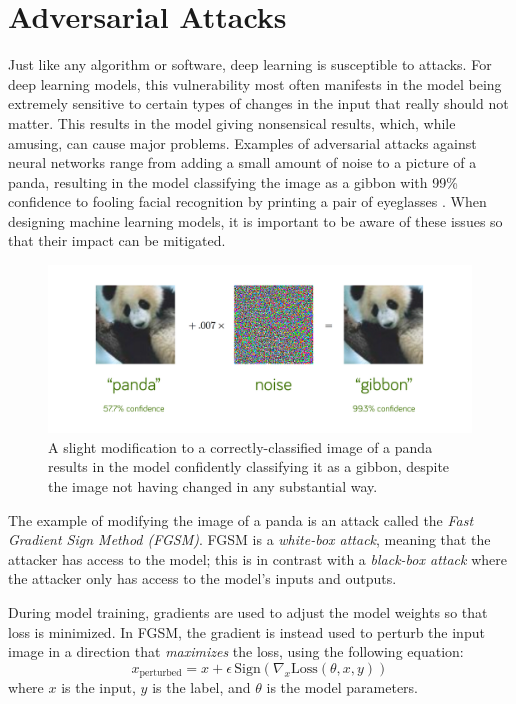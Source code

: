 \section*{Adversarial Attacks}
 
Just like any algorithm or software, deep learning is susceptible to attacks.
For deep learning models, this vulnerability most often manifests in the model being extremely sensitive to certain types of changes in the input that really should not matter.
This results in the model giving nonsensical results, which, while amusing, can cause major problems.
Examples of adversarial attacks against neural networks range from adding a small amount of noise to a picture of a panda, resulting in the model classifying the image as a gibbon with 99\% confidence \cite{goodfellow2015advesarial} to fooling facial recognition by printing a pair of eyeglasses \cite{goodfellow2017physical}.
When designing machine learning models, it is important to be aware of these issues so that their impact can be mitigated.

\begin{figure}[H] %
\centering

 	\includegraphics[width=\textwidth]{figures/panda.png}   
    \caption{A slight modification to a correctly-classified image of a panda results in the model confidently classifying it as a gibbon, despite the image not having changed in any substantial way.}
\end{figure}

The example of modifying the image of a panda is an attack called the \emph{Fast Gradient Sign Method (FGSM)}. 
FGSM is a \emph{white-box attack}, meaning that the attacker has access to the model; this is in contrast with a \emph{black-box attack} where the attacker only has access to the model's inputs and outputs.

During model training, gradients are used to adjust the model weights so that loss is minimized.
In FGSM, the gradient is instead used to perturb the input image in a direction that \emph{maximizes} the loss, using the following equation:
\begin{equation*}
x_\text{perturbed} = x + \epsilon\, \mathrm{Sign}(\nabla_x \mathrm{Loss}(\theta, x, y))
\end{equation*}
where $x$ is the input, $y$ is the label, and $\theta$ is the model parameters.


